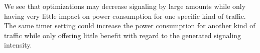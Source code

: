 We see that optimizations may decrease signaling by large amounts while only having very little impact on power consumption for one specific kind of traffic.
The same timer setting could increase the power consumption for another kind of traffic while only offering little benefit with regard to the generated signaling intensity.